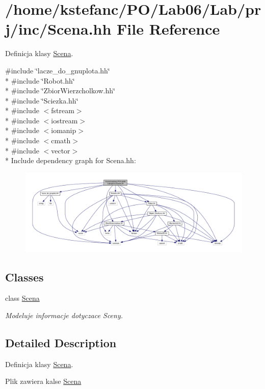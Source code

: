 \hypertarget{_scena_8hh}{\section{/home/kstefanc/\+P\+O/\+Lab06/\+Lab/prj/inc/\+Scena.hh File Reference}
\label{_scena_8hh}
}


Definicja klasy \hyperlink{class_scena}{Scena}.  


{\ttfamily \#include \char`\"{}lacze\+\_\+do\+\_\+gnuplota.\+hh\char`\"{}}\\*
{\ttfamily \#include \char`\"{}Robot.\+hh\char`\"{}}\\*
{\ttfamily \#include \char`\"{}Zbior\+Wierzcholkow.\+hh\char`\"{}}\\*
{\ttfamily \#include \char`\"{}Sciezka.\+hh\char`\"{}}\\*
{\ttfamily \#include $<$fstream$>$}\\*
{\ttfamily \#include $<$iostream$>$}\\*
{\ttfamily \#include $<$iomanip$>$}\\*
{\ttfamily \#include $<$cmath$>$}\\*
{\ttfamily \#include $<$vector$>$}\\*
Include dependency graph for Scena.\+hh\+:\nopagebreak
\begin{figure}[H]
\begin{center}
\leavevmode
\includegraphics[width=350pt]{_scena_8hh__incl}
\end{center}
\end{figure}
\subsection*{Classes}
\begin{DoxyCompactItemize}
\item 
class \hyperlink{class_scena}{Scena}
\begin{DoxyCompactList}\small\item\em Modeluje informacje dotyczace Sceny. \end{DoxyCompactList}\end{DoxyCompactItemize}


\subsection{Detailed Description}
Definicja klasy \hyperlink{class_scena}{Scena}. 

Plik zawiera kalse \hyperlink{class_scena}{Scena} 